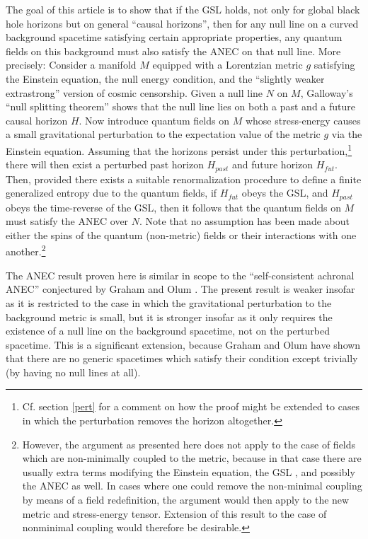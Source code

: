 \documentclass{article}
\begin{document}
The goal of this article is to show that if the GSL holds, not only for global black hole horizons but on general ``causal horizons'', then for any null line on a curved background spacetime satisfying certain appropriate properties, any quantum fields on this background must also satisfy the ANEC on that null line.  More precisely: Consider a manifold $M$ equipped with a Lorentzian metric $g$ satisfying the Einstein equation, the null energy condition, and the ``slightly weaker extrastrong'' \cite{penrose99} version of cosmic censorship.  Given a null line $N$ on $M$, Galloway's ``null splitting theorem'' \cite{galloway00} shows that the null line lies on both a past and a future causal horizon $H$.  Now introduce quantum fields on $M$ whose stress-energy causes a small gravitational perturbation to the expectation value of the metric $g$ via the Einstein equation.  Assuming that the horizons persist under this perturbation,\footnote{Cf. section \ref{pert} for a comment on how the proof might be extended to cases in which the perturbation removes the horizon altogether.} there will then exist a perturbed past horizon $H_{past}$ and future horizon $H_{fut}$.  Then, provided there exists a suitable renormalization procedure to  define a finite generalized entropy due to the quantum fields, if $H_{fut}$ obeys the GSL, and $H_{past}$ obeys the time-reverse of the GSL, then it follows that the quantum fields on $M$ must satisfy the ANEC over $N$.  Note that no assumption has been made about either the spins of the quantum (non-metric) fields or their interactions with one another.\footnote{However, the argument as presented here does not apply to the case of fields which are non-minimally coupled to the metric, because in that case there are usually extra terms modifying the Einstein equation, the GSL \cite{wald93}, and possibly the ANEC as well.  In cases where one could remove the non-minimal coupling by means of a field redefinition, the argument would then apply to the new metric and stress-energy tensor.  Extension of this result to the case of nonminimal coupling would therefore be desirable.}

The ANEC result proven here is similar in scope to the ``self-consistent achronal ANEC'' conjectured by Graham and Olum \cite{GO07}.  The present result is weaker insofar as it is restricted to the case in which the gravitational perturbation to the background metric is small, but it is stronger insofar as it only requires the existence of a null line on the background spacetime, not on the perturbed spacetime.  This is a significant extension, because Graham and Olum have shown that there are no generic spacetimes which satisfy their condition except trivially (by having no null lines at all).
\end{document}
